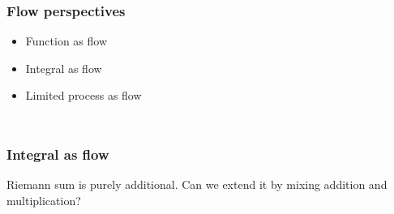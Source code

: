\documentclass[aspectratio=169]{beamer}
\begin{document}
\begin{frame}[fragile]
\frametitle{Flow perspectives}
\begin{itemize}
    \item Function as flow
    \item Integral as flow
    \item Limited process as flow
\end{itemize}
\begin{columns}
\begin{column}{0.5\textwidth}
\begin{center}
\end{center}
\end{column}
\begin{column}{0.5\textwidth}
    \begin{figure}[ht]\centering
    \end{figure}
\end{column}
\end{columns}
\end{frame}

\begin{frame}
\frametitle{Integral as flow}
    Riemann sum is purely additional.
    Can we extend it by mixing addition and multiplication?
\end{frame}
\end{document}
